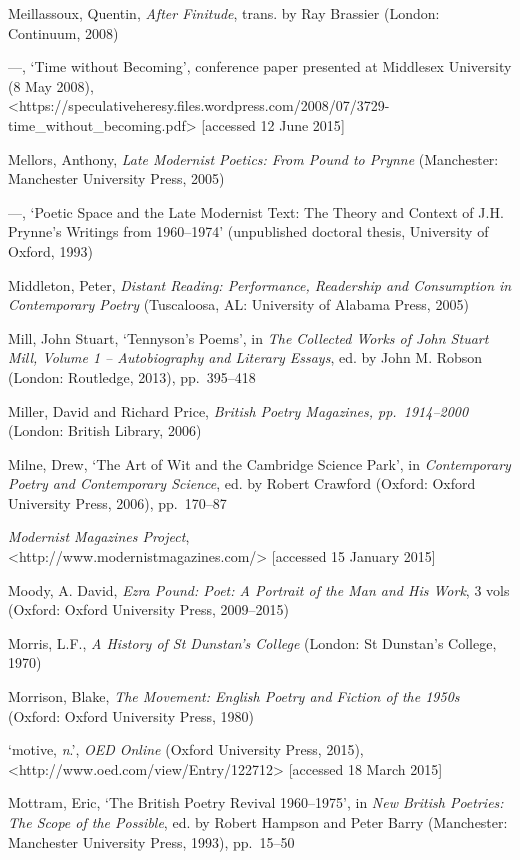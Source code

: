 \documentclass[]{article}
\begin{document}
Meillassoux, Quentin, \emph{After Finitude}, trans. by Ray Brassier
(London: Continuum, 2008)

—, ‘Time without Becoming’, conference paper presented at Middlesex
University (8 May 2008),\\
\textless{}https://speculativeheresy.files.wordpress.com/2008/07/3729-time\_without\_becoming.pdf\textgreater{}
{[}accessed 12 June 2015{]}

Mellors, Anthony, \emph{Late Modernist Poetics: From Pound to Prynne}
(Manchester: Manchester University Press, 2005)

—, ‘Poetic Space and the Late Modernist Text: The Theory and Context of
J.H. Prynne’s Writings from 1960–1974’ (unpublished doctoral thesis,
University of Oxford, 1993)

Middleton, Peter, \emph{Distant Reading: Performance, Readership and
Consumption in Contemporary Poetry} (Tuscaloosa, AL: University of
Alabama Press, 2005)

Mill, John Stuart, ‘Tennyson’s Poems’, in \emph{The Collected Works of
John Stuart Mill, Volume 1 – Autobiography and Literary Essays}, ed. by
John M. Robson (London: Routledge, 2013), pp.~395–418

Miller, David and Richard Price, \emph{British Poetry Magazines,
pp.~1914–2000} (London: British Library, 2006)

Milne, Drew, ‘The Art of Wit and the Cambridge Science Park’, in
\emph{Contemporary Poetry and Contemporary Science}, ed. by Robert
Crawford (Oxford: Oxford University Press, 2006), pp.~170–87

\emph{Modernist Magazines Project},\\
\textless{}http://www.modernistmagazines.com/\textgreater{} {[}accessed
15 January 2015{]}

Moody, A. David, \emph{Ezra Pound: Poet: A Portrait of the Man and His
Work}, 3 vols (Oxford: Oxford University Press, 2009–2015)

Morris, L.F., \emph{A History of St Dunstan’s College} (London: St
Dunstan’s College, 1970)

Morrison, Blake, \emph{The Movement: English Poetry and Fiction of the
1950s} (Oxford: Oxford University Press, 1980)

‘motive, \emph{n}.’, \emph{OED Online} (Oxford University Press,
2015),\\
\textless{}http://www.oed.com/view/Entry/122712\textgreater{}
{[}accessed 18 March 2015{]}

Mottram, Eric, ‘The British Poetry Revival 1960–1975’, in \emph{New
British Poetries: The Scope of the Possible}, ed. by Robert Hampson and
Peter Barry (Manchester: Manchester University Press, 1993), pp.~15–50
\end{document}
